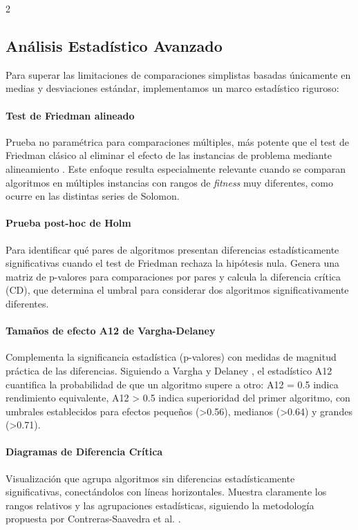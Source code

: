 \documentclass[10pt,a4paper]{extarticle}
\begin{document}
{\begin{multicols}{2}

\subsection{Análisis Estadístico Avanzado}
Para superar las limitaciones de comparaciones simplistas basadas únicamente en medias y desviaciones estándar, implementamos un marco estadístico riguroso:

\paragraph{Test de Friedman alineado} Prueba no paramétrica para comparaciones múltiples, más potente que el test de Friedman clásico al eliminar el efecto de las instancias de problema mediante alineamiento \cite{Li2020SMA}. Este enfoque resulta especialmente relevante cuando se comparan algoritmos en múltiples instancias con rangos de \textit{fitness} muy diferentes, como ocurre en las distintas series de Solomon.

\paragraph{Prueba post-hoc de Holm} Para identificar qué pares de algoritmos presentan diferencias estadísticamente significativas cuando el test de Friedman rechaza la hipótesis nula. Genera una matriz de p-valores para comparaciones por pares y calcula la diferencia crítica (CD), que determina el umbral para considerar dos algoritmos significativamente diferentes.

\paragraph{Tamaños de efecto A12 de Vargha-Delaney} Complementa la significancia estadística (p-valores) con medidas de magnitud práctica de las diferencias. Siguiendo a Vargha y Delaney \cite{Vargha2000}, el estadístico A12 cuantifica la probabilidad de que un algoritmo supere a otro: A12 = 0.5 indica rendimiento equivalente, A12 > 0.5 indica superioridad del primer algoritmo, con umbrales establecidos para efectos pequeños (>0.56), medianos (>0.64) y grandes (>0.71).

\paragraph{Diagramas de Diferencia Crítica} Visualización que agrupa algoritmos sin diferencias estadísticamente significativas, conectándolos con líneas horizontales. Muestra claramente los rangos relativos y las agrupaciones estadísticas, siguiendo la metodología propuesta por Contreras-Saavedra et al. \cite{Contreras2024CD}.
\end{multicols}

}
\end{document}
